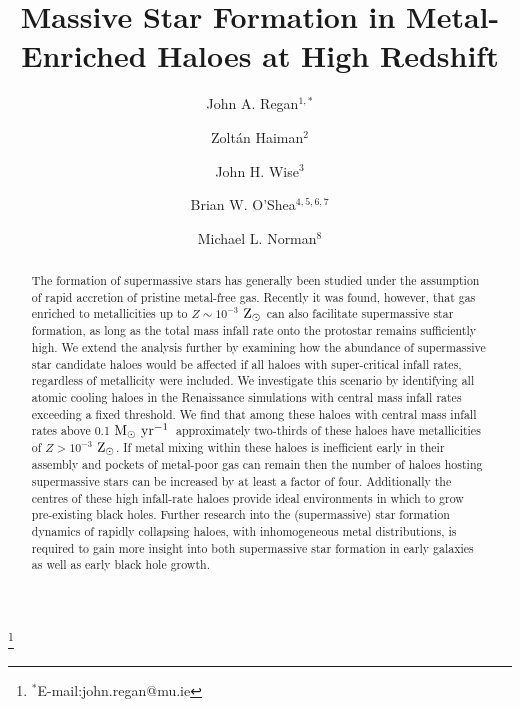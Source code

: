 \documentclass[twocolumn,iop,revtex4]{openjournal}
\newcommand{\msolaryrc} {$\rm{M_{\odot}~yr^{-1}}$}
\newcommand{\zsolar} {$\rm{Z_{\odot}}~$}
\newcommand{\zsolarc} {$\rm{Z_{\odot}}$}
\begin{document}
\title{Massive Star Formation in Metal-Enriched Haloes at High Redshift}
\author{John A. Regan$^{1, *}$}
\thanks{$^*$E-mail:john.regan@mu.ie}
\author{Zolt\'an Haiman$^{2}$}
\author{John H. Wise$^{3}$}
\author{Brian W. O'Shea$^{4,5,6,7}$}
\author{Michael L. Norman$^8$}


\begin{abstract}
  The formation of supermassive stars has generally been studied under the assumption of 
  rapid accretion of pristine metal-free gas. Recently it was found, however, that gas enriched
  to metallicities up to $Z \sim 10^{-3}$ \zsolar can also facilitate supermassive star formation,
  as long as the total mass infall rate onto the protostar remains sufficiently high. We extend the
  analysis further by examining how the abundance of supermassive star candidate haloes would be
  affected if all haloes with super-critical infall rates, regardless of metallicity
  were included. We investigate this scenario by identifying all atomic cooling haloes in the
  Renaissance simulations with central mass infall rates exceeding a fixed threshold.
  We find that among these haloes with central mass infall rates above 0.1 \msolaryrc\ approximately
  two-thirds of these haloes have metallicities of $Z > 10^{-3}$ \zsolarc.
  If metal mixing within these haloes is
  inefficient early in their assembly and pockets of metal-poor gas can remain then the
  number of haloes hosting supermassive stars can be increased by at least a factor of four.
  Additionally the centres of these high infall-rate haloes provide ideal environments in which to grow
  pre-existing black holes. Further research into the (supermassive) star
  formation dynamics of rapidly collapsing haloes, with inhomogeneous
  metal distributions, is required to gain more insight into both supermassive star
  formation in early galaxies as well as early black hole growth.   
\end{abstract}
\end{document}
